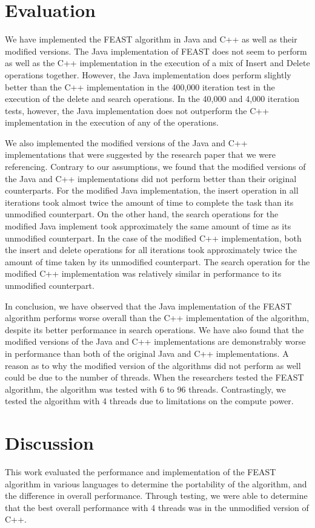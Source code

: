 \documentclass[conference]{IEEEtran}
\begin{document}
\section{Evaluation}
We have implemented the FEAST algorithm in Java and C++ as well as their modified versions. The Java implementation of FEAST does not seem to perform as well as the C++ implementation in the execution of a mix of Insert and Delete operations together. However, the Java implementation does perform slightly better than the C++ implementation in the 400,000 iteration test in the execution of the delete and search operations. In the 40,000 and 4,000 iteration tests, however, the Java implementation does not outperform the C++ implementation in the execution of any of the operations.

We also implemented the modified versions of the Java and C++ implementations that were suggested by the research paper that we were referencing. Contrary to our assumptions, we found that the modified versions of the Java and C++ implementations did not perform better than their original counterparts. For the modified Java implementation, the insert operation in all iterations took almost twice the amount of time to complete the task than its unmodified counterpart. On the other hand, the search operations for the modified Java implement took approximately the same amount of time as its unmodified counterpart. In the case of the modified C++ implementation, both the insert and delete operations for all iterations took approximately twice the amount of time taken by its unmodified counterpart. The search operation for the modified C++ implementation was relatively similar in performance to its unmodified counterpart.

In conclusion, we have observed that the Java implementation of the FEAST algorithm performs worse overall than the C++ implementation of the algorithm, despite its better performance in search operations. We have also found that the modified versions of the Java and C++ implementations are demonstrably worse in performance than both of the original Java and C++ implementations. A reason as to why the modified version of the algorithms did not perform as well could be due to the number of threads. When the researchers tested the FEAST algorithm, the algorithm was tested with 6 to 96 threads. Contrastingly, we tested the algorithm with 4 threads due to limitations on the compute power. 


\section{Discussion}
This work evaluated the performance and implementation of the FEAST algorithm in various languages to determine the portability of the algorithm, and the difference in overall performance. Through testing, we were able to determine that the best overall performance with 4 threads was in the unmodified version of C++. 
\end{document}
